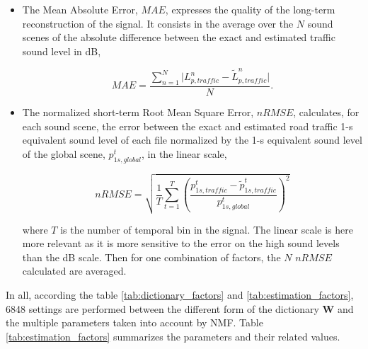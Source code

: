 \documentclass[twocolumn,a4paper,10pt]{article}
\begin{document}
\begin{itemize}

\item The Mean Absolute Error, $MAE$, expresses the quality of the long-term reconstruction of the signal. It consists in the average over the $N$ sound scenes of the absolute difference between the exact and estimated traffic sound level in dB,

\begin{equation}
MAE = \frac{\sum_{n = 1}^N\vert L^n_{p,traffic}-\tilde{L}^n_{p,traffic} \vert}{N}.
\end{equation}

\item The normalized short-term Root Mean Square Error, $nRMSE$, calculates, for each sound scene, the error between the exact and estimated road traffic 1-s equivalent sound level of each file normalized by the 1-s equivalent sound level of the global scene, $p^t_{1s,global}$, in the linear scale,

\begin{equation}
nRMSE = \sqrt{\frac{1}{T}\sum_{t = 1}^T \left(\frac{p^t_{1s,traffic}-\tilde{p}^t_{1s,traffic}}{p^t_{1s,global}}\right)^2}
\end{equation}

where $T$ is the number of temporal bin in the signal. The linear scale is here more relevant as it is more sensitive to the error on the high sound levels than the dB scale. Then for one combination of factors, the $N$ $nRMSE$ calculated are averaged.\\
\end{itemize}

In all, according the table \ref{tab:dictionary_factors} and \ref{tab:estimation_factors}, 6848 settings are performed between the different form of the dictionary $\mathbf{W}$ and the multiple parameters taken into account by NMF. Table \ref{tab:estimation_factors} summarizes the parameters and their related values.
\end{document}
